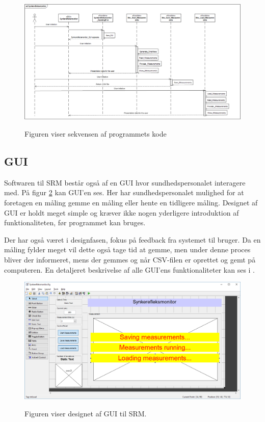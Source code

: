 \begin{figure}[H]
\centering
{\includegraphics[width=\linewidth]
{Figure/SekevensDiagram}}
\caption{Figuren viser sekvensen af programmets kode}
\label{Fig:SekevensDiagram}
\end{figure} 


\subsection{GUI}

Softwaren til SRM består også af en GUI hvor sundhedspersonalet interagere med. På figur \ref{Fig:designGUI} kan GUI'en ses. Her har sundhedspersonalet mulighed for at foretagen en måling gemme en måling eller hente en tidligere måling. Designet af GUI er holdt meget simple og kræver ikke nogen yderligere introduktion af funktionaliteten, før programmet kan bruges. 

Der har også været i designfasen, fokus på feedback fra systemet til bruger. Da en måling fylder meget vil dette også tage tid at gemme, men under denne proces bliver der informeret, mens der gemmes og når CSV-filen er oprettet og gemt på computeren. En detaljeret beskrivelse af alle GUI'ens funktionaliteter kan ses i .


\begin{figure}[H]
\centering
{\includegraphics[width=\linewidth]
{Figure/designGUI}}
\caption{Figuren viser designet af GUI til SRM.}
\label{Fig:designGUI}
\end{figure} 